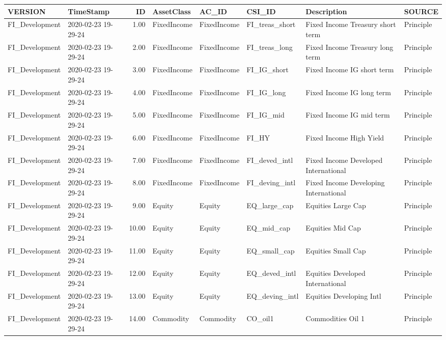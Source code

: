 \begin{longtable}{llrlllll}
  \hline
VERSION & TimeStamp & ID & AssetClass & AC\_ID & CSI\_ID & Description & SOURCE \\ 
  \hline
FI\_Development & 2020-02-23 19-29-24 & 1.00 & FixedIncome & FixedIncome & FI\_treas\_short & Fixed Income Treasury short term & Principle \\ 
  FI\_Development & 2020-02-23 19-29-24 & 2.00 & FixedIncome & FixedIncome & FI\_treas\_long & Fixed Income Treasury long term & Principle \\ 
  FI\_Development & 2020-02-23 19-29-24 & 3.00 & FixedIncome & FixedIncome & FI\_IG\_short & Fixed Income IG short term & Principle \\ 
  FI\_Development & 2020-02-23 19-29-24 & 4.00 & FixedIncome & FixedIncome & FI\_IG\_long & Fixed Income IG long term & Principle \\ 
  FI\_Development & 2020-02-23 19-29-24 & 5.00 & FixedIncome & FixedIncome & FI\_IG\_mid & Fixed Income IG mid term & Principle \\ 
  FI\_Development & 2020-02-23 19-29-24 & 6.00 & FixedIncome & FixedIncome & FI\_HY & Fixed Income High Yield & Principle \\ 
  FI\_Development & 2020-02-23 19-29-24 & 7.00 & FixedIncome & FixedIncome & FI\_deved\_intl & Fixed Income Developed International & Principle \\ 
  FI\_Development & 2020-02-23 19-29-24 & 8.00 & FixedIncome & FixedIncome & FI\_deving\_intl & Fixed Income Developing International & Principle \\ 
  FI\_Development & 2020-02-23 19-29-24 & 9.00 & Equity & Equity & EQ\_large\_cap & Equities Large Cap & Principle \\ 
  FI\_Development & 2020-02-23 19-29-24 & 10.00 & Equity & Equity & EQ\_mid\_cap & Equities Mid Cap & Principle \\ 
  FI\_Development & 2020-02-23 19-29-24 & 11.00 & Equity & Equity & EQ\_small\_cap & Equities Small Cap & Principle \\ 
  FI\_Development & 2020-02-23 19-29-24 & 12.00 & Equity & Equity & EQ\_deved\_intl & Equities Developed International & Principle \\ 
  FI\_Development & 2020-02-23 19-29-24 & 13.00 & Equity & Equity & EQ\_deving\_intl & Equities Developing Intl & Principle \\ 
  FI\_Development & 2020-02-23 19-29-24 & 14.00 & Commodity & Commodity & CO\_oil1 & Commodities Oil 1 & Principle \\ 

\end{longtable}
